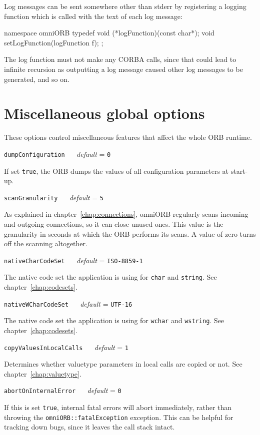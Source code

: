 \documentclass[11pt,twoside,a4paper]{book}
\makeatletter
\newcommand{\type}[1]{\texttt{#1}}
\newcommand{\code}[1]{\texttt{#1}}
\newcommand{\confopt}[2]
  {\vspace{\baselineskip}\par\noindent\code{#1} ~~ \textit{default} =
   \code{#2}}
\renewcommand{\confopt}[2]
  {\vspace{\baselineskip}\par\noindent\code{#1} ~~ \textit{default} =
   \code{#2}\\[-1ex]\@afterheading}
\makeatother
\begin{document}
\noindent
Log messages can be sent somewhere other than stderr by registering a
logging function which is called with the text of each log message:

\begin{cxxlisting}
namespace omniORB {
  typedef void (*logFunction)(const char*);
  void setLogFunction(logFunction f);
};
\end{cxxlisting}

\noindent
The log function must not make any CORBA calls, since that could lead
to infinite recursion as outputting a log message caused other log
messages to be generated, and so on.




\section{Miscellaneous global options}

These options control miscellaneous features that affect the whole ORB
runtime.

\confopt{dumpConfiguration}{0}

If set \code{true}, the ORB dumps the values of all configuration
parameters at start-up.


\confopt{scanGranularity}{5}

As explained in chapter~\ref{chap:connections}, omniORB regularly
scans incoming and outgoing connections, so it can close unused
ones. This value is the granularity in seconds at which the ORB
performs its scans. A value of zero turns off the scanning altogether.


\confopt{nativeCharCodeSet}{ISO-8859-1}

The native code set the application is using for \type{char} and
\type{string}. See chapter~\ref{chap:codesets}.


\confopt{nativeWCharCodeSet}{UTF-16}

The native code set the application is using for \type{wchar} and
\type{wstring}. See chapter~\ref{chap:codesets}.


\confopt{copyValuesInLocalCalls}{1}

Determines whether valuetype parameters in local calls are copied or
not. See chapter~\ref{chap:valuetype}.


\confopt{abortOnInternalError}{0}

If this is set \code{true}, internal fatal errors will abort
immediately, rather than throwing the \type{omniORB::fatalException}
exception.  This can be helpful for tracking down bugs, since it
leaves the call stack intact.
\end{document}
